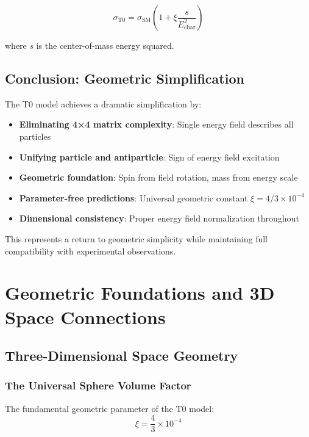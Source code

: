 \documentclass[12pt,a4paper]{report}
\begin{document}
\begin{equation}
	\sigma_{\text{T0}} = \sigma_{\text{SM}} \left(1 + \xi \frac{s}{E_{\text{char}}^2}\right)
\end{equation}

where $s$ is the center-of-mass energy squared.

\section{Conclusion: Geometric Simplification}
\label{sec:conclusion}

The T0 model achieves a dramatic simplification by:

\begin{itemize}
	\item \textbf{Eliminating 4×4 matrix complexity}: Single energy field describes all particles
	\item \textbf{Unifying particle and antiparticle}: Sign of energy field excitation
	\item \textbf{Geometric foundation}: Spin from field rotation, mass from energy scale
	\item \textbf{Parameter-free predictions}: Universal geometric constant $\xi = 4/3 \times 10^{-4}$
	\item \textbf{Dimensional consistency}: Proper energy field normalization throughout
\end{itemize}

This represents a return to geometric simplicity while maintaining full compatibility with experimental observations.

\chapter{Geometric Foundations and 3D Space Connections}
\label{chap:geometric_foundations}
\section{Three-Dimensional Space Geometry}
\label{sec:3d_space_geometry}

\subsection{The Universal Sphere Volume Factor}
\label{subsec:sphere_volume_factor}

The fundamental geometric parameter of the T0 model:
\begin{equation}
	\xi = \frac{4}{3} \times 10^{-4}
\end{equation}
\end{document}

